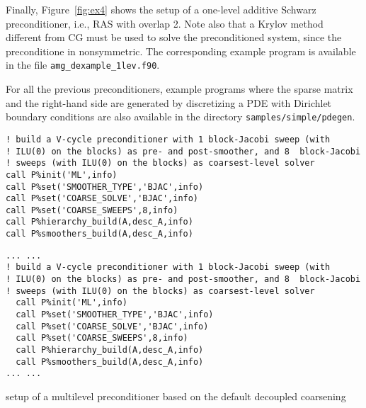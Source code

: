 Finally, Figure~\ref{fig:ex4} shows the setup of a one-level
additive Schwarz preconditioner, i.e., RAS with overlap 2.
Note also that a Krylov method different from CG must be used to solve
the preconditioned system, since the preconditione in nonsymmetric.
The corresponding example program is available in the file
\verb|amg_dexample_1lev.f90|.

For all the previous preconditioners, example programs where the sparse matrix and
the right-hand side are generated by discretizing a PDE with Dirichlet
boundary conditions are also available in the directory \verb|samples/simple/pdegen|.
\vspace{-1em}\begin{listing}[tbh]
\ifpdf%
\begin{verbatim}
! build a V-cycle preconditioner with 1 block-Jacobi sweep (with
! ILU(0) on the blocks) as pre- and post-smoother, and 8  block-Jacobi
! sweeps (with ILU(0) on the blocks) as coarsest-level solver
call P%init('ML',info)
call P%set('SMOOTHER_TYPE','BJAC',info)
call P%set('COARSE_SOLVE','BJAC',info)
call P%set('COARSE_SWEEPS',8,info)
call P%hierarchy_build(A,desc_A,info)
call P%smoothers_build(A,desc_A,info)
\end{verbatim}
\else%
\begin{center}
\begin{minipage}{.90\textwidth}
{\small
\begin{verbatim}
... ...
! build a V-cycle preconditioner with 1 block-Jacobi sweep (with
! ILU(0) on the blocks) as pre- and post-smoother, and 8  block-Jacobi
! sweeps (with ILU(0) on the blocks) as coarsest-level solver
  call P%init('ML',info)
  call P%set('SMOOTHER_TYPE','BJAC',info)
  call P%set('COARSE_SOLVE','BJAC',info)
  call P%set('COARSE_SWEEPS',8,info)
  call P%hierarchy_build(A,desc_A,info)
  call P%smoothers_build(A,desc_A,info)
... ...
\end{verbatim}
}
\end{minipage}
\end{center}
\fi\vspace{-2em}%
\caption{setup of a multilevel preconditioner based on the default decoupled coarsening\label{fig:ex2}}
\end{listing}\vspace*{-2em}

